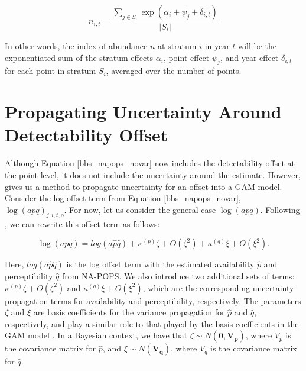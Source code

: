 \documentclass[12pt]{article}
\begin{document}
$$
n_{i,t} = \dfrac{\sum_{j\in S_i}\exp(\alpha_i + \psi_j + \delta_{i,t})}{|S_i|}
$$

In other words, the index of abundance $n$ at stratum $i$ in year $t$ will be the exponentiated sum of the stratum effects $\alpha_i$, point effect $\psi_j$, and year effect $\delta_{i,t}$ for each point in stratum $S_i$, averaged over the number of points.

\section{Propagating Uncertainty Around Detectability Offset}
Although Equation \ref{bbs_napops_novar} now includes the detectability offset at the point level, it does not include the uncertainty around the estimate. However, \citet{bravington_variance_2021} gives us a method to propagate uncertainty for an offset into a GAM model. Consider the log offset term from Equation \ref{bbs_napops_novar}, $\log(apq)_{j,i,t,o}$. For now, let us consider the general case $\log(apq)$. Following \citet{bravington_variance_2021}, we can rewrite this offset term as follows:

\begin{equation}\label{offset}
	\log(apq) = log(a\hat{p} \hat{q}) + \kappa^{(p)}\zeta + O(\zeta^2) + \kappa^{(q)}\xi + O(\xi^2).
\end{equation}
	 
\par Here, $log(a \hat{p} \hat{q})$ is the log offset term with the estimated availability $\hat{p}$ and perceptibility $\hat{q}$ from NA-POPS. We also introduce two additional sets of terms: $\kappa^{(p)}\zeta + O(\zeta^2)$ and $\kappa^{(q)}\xi + O(\xi^2)$, which are the corresponding uncertainty propagation terms for availability and perceptibility, respectively.  The parameters $\zeta$ and $\xi$ are basis coefficients for the variance propagation for $\hat{p}$ and $\hat{q}$, respectively, and play a similar role to that played by the basis coefficients in the GAM model \citep{bravington_variance_2021}. In a Bayesian context, we have that $\zeta \sim N(\boldsymbol{0}, \boldsymbol{V_p})$, where $V_p$ is the covariance matrix for $\hat{p}$, and $\xi \sim N(\boldsymbol{V_q})$, where $V_q$ is the covariance matrix for $\hat{q}$.
\end{document}
